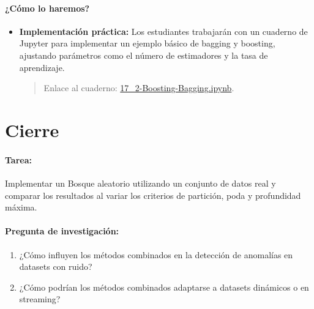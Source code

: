 \documentclass[a4,11pt]{aleph-notas}
\begin{document}
\paragraph{¿Cómo lo haremos?}  
\begin{itemize}[leftmargin=*]
    \item \textbf{Implementación práctica:}  
    Los estudiantes trabajarán con un cuaderno de Jupyter para implementar un ejemplo básico de bagging y boosting, ajustando parámetros como el número de estimadores y la tasa de aprendizaje.
    \begin{quote}
        Enlace al cuaderno: \href{https://colab.research.google.com/github/andres-merino/AprendizajeAutomaticoInicial-05-N0105/blob/main/2-Notebooks/17_2-Boosting-Bagging.ipynb}{17\_2-Boosting-Bagging.ipynb}.
    \end{quote}
\end{itemize}


\section*{Cierre}  

\paragraph{Tarea:}  
Implementar un Bosque aleatorio utilizando un conjunto de datos real y comparar los resultados al variar los criterios de partición, poda y profundidad máxima.  

\paragraph{Pregunta de investigación:}  
\begin{enumerate}[leftmargin=*]  
    \item ¿Cómo influyen los métodos combinados en la detección de anomalías en datasets con ruido?
    \item ¿Cómo podrían los métodos combinados adaptarse a datasets dinámicos o en streaming?
\end{enumerate}  
\end{document}
